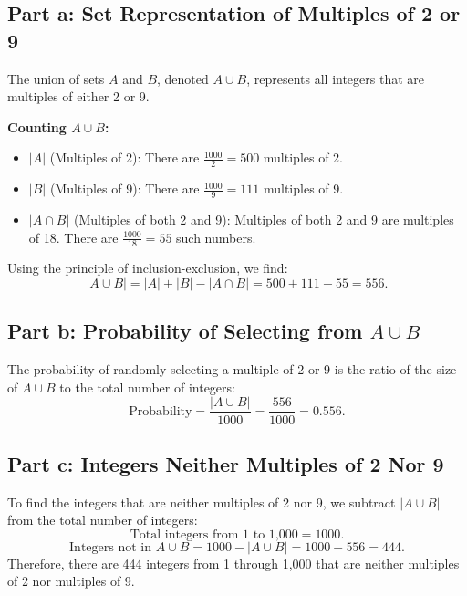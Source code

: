 \documentclass[12pt]{article}
\begin{document}
\subsection{Part a: Set Representation of Multiples of 2 or 9}
The union of sets \( A \) and \( B \), denoted \( A \cup B \), represents all integers that are multiples of either 2 or 9.

\textbf{Counting \( A \cup B \):}
\begin{itemize}
    \item \( |A| \) (Multiples of 2): There are \(\frac{1000}{2} = 500\) multiples of 2.
    \item \( |B| \) (Multiples of 9): There are \(\frac{1000}{9} = 111\) multiples of 9.
    \item \( |A \cap B| \) (Multiples of both 2 and 9): Multiples of both 2 and 9 are multiples of 18. There are \(\frac{1000}{18} = 55\) such numbers.
\end{itemize}
Using the principle of inclusion-exclusion, we find:
\[ |A \cup B| = |A| + |B| - |A \cap B| = 500 + 111 - 55 = 556. \]

\subsection{Part b: Probability of Selecting from \( A \cup B \)}
The probability of randomly selecting a multiple of 2 or 9 is the ratio of the size of \( A \cup B \) to the total number of integers:
\[ \text{Probability} = \frac{|A \cup B|}{1000} = \frac{556}{1000} = 0.556. \]

\subsection{Part c: Integers Neither Multiples of 2 Nor 9}
To find the integers that are neither multiples of 2 nor 9, we subtract \( |A \cup B| \) from the total number of integers:
\[ \text{Total integers from 1 to 1,000} = 1000. \]
\[ \text{Integers not in } A \cup B = 1000 - |A \cup B| = 1000 - 556 = 444. \]
Therefore, there are 444 integers from 1 through 1,000 that are neither multiples of 2 nor multiples of 9.
\end{document}

